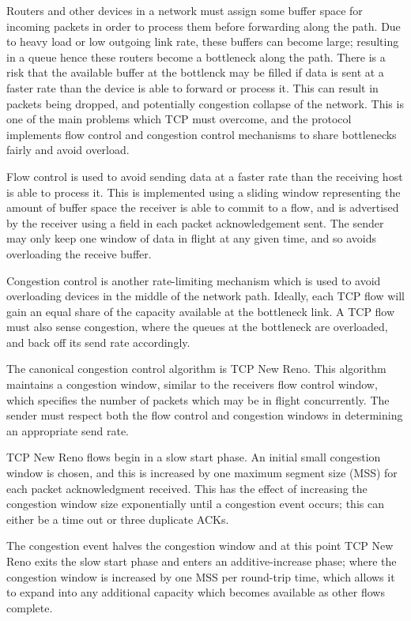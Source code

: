 Routers and other devices in a network must assign some buffer space for
incoming packets in order to process them before forwarding along the path.
Due to heavy load or low outgoing link rate, these buffers can become large;
resulting in a queue hence these routers become a bottleneck along the path.
There is a risk that the available buffer at the bottlenck may be filled if
data is sent at a faster rate than the device is able to forward or process it.
This can result in packets being dropped, and potentially congestion collapse
of the network. This is one of the main problems which TCP must overcome, and
the protocol implements flow control and congestion control mechanisms to share
bottlenecks fairly and avoid overload.

Flow control is used to avoid sending data at a faster rate than the receiving
host is able to process it. This is implemented using a sliding window
representing the amount of buffer space the receiver is able to commit to a
flow, and is advertised by the receiver using a field in each packet
acknowledgement sent. The sender may only keep one window of data in flight at
any given time, and so avoids overloading the receive buffer.

Congestion control is another rate-limiting mechanism which is used to avoid
overloading devices in the middle of the network path. Ideally, each TCP flow
will gain an equal share of the capacity available at the bottleneck link. A TCP
flow must also sense congestion, where the queues at the bottleneck are
overloaded, and back off its send rate accordingly.

The canonical congestion control algorithm is TCP New Reno. This algorithm
maintains a congestion window, similar to the receivers flow control window,
which specifies the number of packets which may be in flight concurrently. The
sender must respect both the flow control and congestion windows in determining
an appropriate send rate.

TCP New Reno flows begin in a slow start phase. An initial small congestion
window is chosen, and this is increased by one maximum segment size (MSS) for
each packet acknowledgment received. This has the effect of increasing the
congestion window size exponentially until a congestion event occurs; this can 
either be a time out or three duplicate ACKs. 

The congestion event halves the congestion window and at this point TCP New Reno 
exits the slow start phase and enters an additive-increase phase; where the 
congestion window is increased by one MSS per round-trip time, which allows it 
to expand into any additional capacity which becomes available as other flows 
complete.

